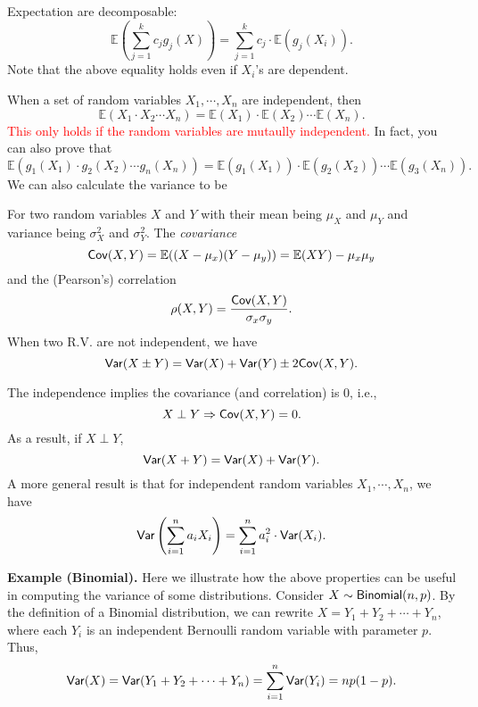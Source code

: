\documentclass[twoside]{article}
\newcommand\E{\mathbb{E}}
\newcommand{\note}[1]{\textcolor{red}{#1}}
\begin{document}
Expectation are decomposable: 
$$
\E\left(\sum_{j=1}^k c_j g_j(X)\right) = \sum_{j=1}^k c_j \cdot\E(g_j(X_i)).
$$
Note that the above equality holds even if $X_i$'s are dependent. 

When a set of random variables  $X_1,\cdots,X_n$ are independent, 
then 
$$
\E\left(X_1\cdot X_2\cdots X_n\right) = \E(X_1)\cdot \E(X_2)\cdots \E(X_n).
$$
\note{This only holds if the random variables are mutaully independent.}
In fact, you can also prove that 
$$
\E\left(g_1(X_1)\cdot g_2(X_2)\cdots g_n(X_n)\right) = \E(g_1(X_1))\cdot \E(g_2(X_2))\cdots \E(g_3(X_n)).
$$
We can also calculate the variance to be 




For two random variables $X$ and $Y$ with their mean being $\mu_X$ and $\mu_Y$
and variance being $\sigma^2_X$ and $\sigma^2_Y$. 
The \emph{covariance }
$$
{\sf Cov}(X,Y) = \E((X-\mu_x)(Y-\mu_y)) = \E(XY) - \mu_x\mu_y
$$
and the (Pearson's) correlation $$
\rho(X,Y) = \frac{{\sf Cov}(X,Y)}{\sigma_x\sigma_y}.
$$
When two R.V. are not independent, we have 
$$
{\sf Var}(X\pm Y) = {\sf Var}(X) + {\sf Var}(Y) \pm 2{\sf Cov}(X,Y).
$$

The independence implies the covariance (and correlation) is $0$, i.e.,
$$
X\perp Y \Rightarrow {\sf Cov}(X,Y) = 0.
$$
As a result, if $X\perp Y$,
$$
{\sf Var}(X+Y) = {\sf Var}(X)+{\sf Var}(Y).
$$
A more general result is that for independent random variables
$X_1,\cdots,X_n$, we have
$$
{\sf Var}\left(\sum_{i=1}^n a_iX_i\right) = \sum_{i=1}^n a_i^2 \cdot {\sf Var}(X_i).
$$



{\bf Example (Binomial).}
Here we illustrate how the above properties can be useful in computing the variance of some distributions.
Consider $X\sim {\sf Binomial}(n,p)$.
By the definition of a Binomial distribution, we can rewrite $X= Y_1+Y_2+\cdots+Y_n$,
where each $Y_i$  is an independent Bernoulli random variable with parameter $p$.
Thus, 
$$
{\sf Var}(X) ={\sf Var}(Y_1+Y_2+\cdots+Y_n) = \sum_{i=1}^n {\sf Var}(Y_i) = n p(1-p).
$$

\end{document}
